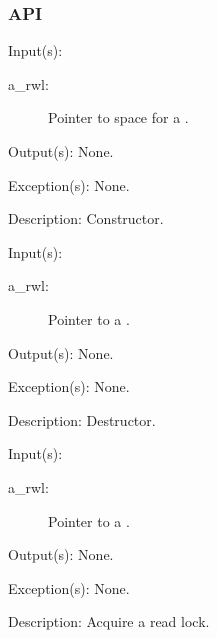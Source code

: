 \subsubsection{API}
\begin{capi}
\label{rwl_new}
	\begin{capilist}
	\item[Input(s): ]
		\begin{description}\item[]
		\item[a\_rwl: ]
			Pointer to space for a .
		\end{description}
	\item[Output(s): ] None.
	\item[Exception(s): ] None.
	\item[Description: ]
		Constructor.
	\end{capilist}
\label{rwl_delete}
	\begin{capilist}
	\item[Input(s): ]
		\begin{description}\item[]
		\item[a\_rwl: ]
			Pointer to a \classname{rwl}.
		\end{description}
	\item[Output(s): ] None.
	\item[Exception(s): ] None.
	\item[Description: ]
		Destructor.
	\end{capilist}
\label{rwl_rlock}
	\begin{capilist}
	\item[Input(s): ]
		\begin{description}\item[]
		\item[a\_rwl: ]
			Pointer to a .
		\end{description}
	\item[Output(s): ] None.
	\item[Exception(s): ] None.
	\item[Description: ]
		Acquire a read lock.
	\end{capilist}
\label{rwl_runlock}

\end{capi}
